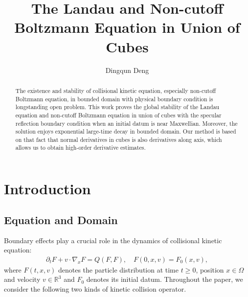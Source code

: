 \documentclass[reqno,a4paper]{amsart}
\title{The Landau and Non-cutoff Boltzmann Equation in Union of Cubes}
\author[D.-Q. Deng]{Dingqun Deng    
}
\numberwithin{equation}{section}
\newcommand{\1}{\mathbf{1}}
\newcommand{\R}{\mathbb{R}}
\newcommand{\pa}{\partial}
\newcommand{\na}{\nabla}
\newcommand{\<}{\langle}
\renewcommand{\>}{\rangle}
\begin{document}
		
	
	
	
	\begin{abstract}
		The existence and stability of collisional kinetic equation, especially non-cutoff Boltzmann equation, in bounded domain with physical boundary condition is longstanding open problem. This work proves the global stability of the Landau equation and non-cutoff Boltzmann equation in union of cubes with the specular reflection boundary condition when an initial datum is near Maxwellian.
		Moreover, the solution enjoys exponential large-time decay in bounded domain. 
		 Our method is based on that fact that normal derivatives in cubes is also derivatives along axis, which allows us to obtain high-order derivative estimates. 
		
		
	\end{abstract}
\maketitle

	\tableofcontents
	
\section{Introduction}


\subsection{Equation and Domain}
	Boundary effects play a crucial role in the dynamics of collisional kinetic equation:
	\begin{align*}
		\pa_t F +v\cdot\na_x F =Q(F,F), \quad F(0,x,v)=F_0(x,v), 
	\end{align*}
where $F(t,x,v)$ denotes the particle distribution at time $t\ge 0$, position $x\in\Omega$ and velocity $v\in\R^3$ and $F_0$ denotes its initial datum. Throughout the paper, we consider the following two kinds of kinetic collision operator. 
\end{document}

